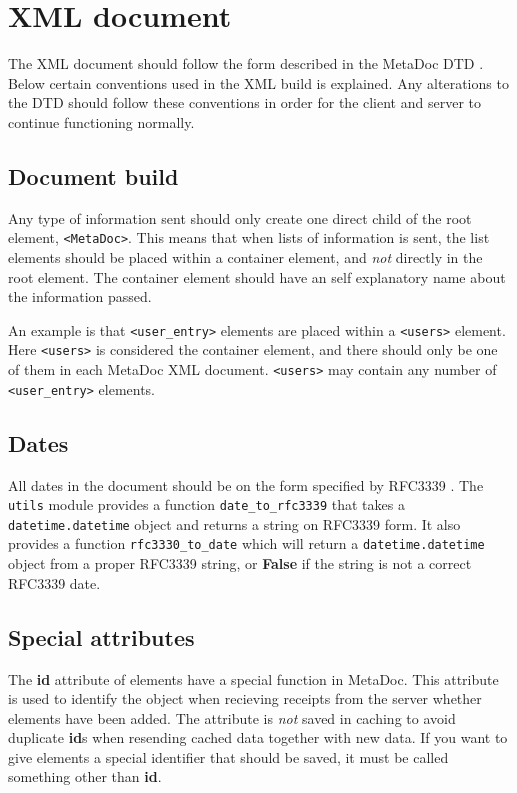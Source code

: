 \newpage
\section{XML document}
\label{sec:xmldoc}
The XML document should follow the form described in the MetaDoc DTD 
\cite{metadoc_dtd}. Below certain conventions used in the XML build is 
explained. Any alterations to the DTD should follow these conventions in order
for the client and server to continue functioning normally. 

\subsection{Document build}
Any type of information sent should only create one direct child of the root
element, \texttt{<MetaDoc>}. This means that when lists of information is sent, 
the list elements should be placed within a container element, and \textit{not} 
directly in the root element. The container element should have an self
explanatory name about the information passed. 

An example is that \texttt{<user\_entry>} elements are placed within a
\texttt{<users>} element. Here \texttt{<users>} is considered the container
element, and there should only be one of them in each MetaDoc XML document.
\texttt{<users>} may contain any number of \texttt{<user\_entry>} elements. 

\subsection{Dates}
All dates in the document should be on the form specified by RFC3339 
\cite{rfc3339}. The \texttt{utils} module provides a function 
\texttt{date\_to\_rfc3339} that takes a \texttt{datetime.datetime} object and 
returns a string on RFC3339 form. It also provides a function
\texttt{rfc3330\_to\_date} which will return a \texttt{datetime.datetime}
object from a proper RFC3339 string, or \textbf{False} if the string is not a
correct RFC3339 date.

\subsection{Special attributes}
The \textbf{id} attribute of elements have a special function in MetaDoc. This 
attribute is used to identify the object when recieving receipts from the server 
whether elements have been added. The attribute is \textit{not} saved in caching 
to avoid duplicate \textbf{id}s when resending cached data together with new 
data. If you want to give elements a special identifier that should be saved, it 
must be called something other than \textbf{id}.
